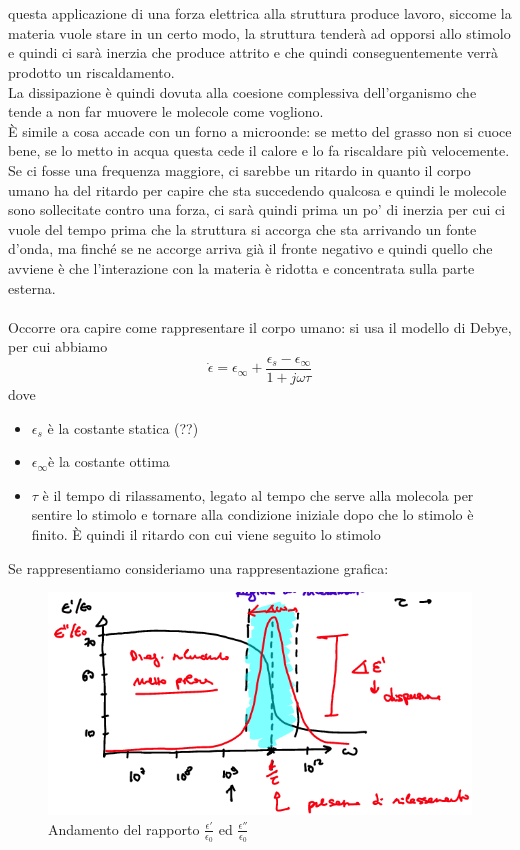 \documentclass[oneside, 12pt]{extbook}
\begin{document}
\\\\questa applicazione di una forza elettrica alla struttura produce lavoro, siccome la materia vuole stare in un certo modo, la struttura tenderà ad opporsi allo stimolo e quindi ci sarà inerzia che produce attrito e che quindi conseguentemente verrà prodotto un riscaldamento.\\La dissipazione è quindi dovuta alla coesione complessiva dell'organismo che tende a non far muovere le molecole come vogliono.\\È simile a cosa accade con un forno a microonde: se metto del grasso non si cuoce bene, se lo metto in acqua questa cede il calore e lo fa riscaldare più velocemente.\\Se ci fosse una frequenza maggiore, ci sarebbe un ritardo in quanto il corpo umano ha del ritardo per capire che sta succedendo qualcosa e quindi le molecole sono sollecitate contro una forza, ci sarà quindi prima un po' di inerzia per cui ci vuole del tempo prima che la struttura si accorga che sta arrivando un fonte d'onda, ma finché se ne accorge arriva già il fronte negativo e quindi quello che avviene è che l'interazione con la materia è ridotta e concentrata sulla parte esterna.\\\\Occorre ora capire come rappresentare il corpo umano: si usa il modello di Debye, per cui abbiamo
\begin{equation}
	\dot{\epsilon} = \epsilon_{\infty} + \dfrac{\epsilon_s - \epsilon_{\infty}}{1 + j\omega \tau} 
\end{equation}
dove
\begin{itemize}
	\item $\epsilon_s$ è la costante statica (??)
	\item $\epsilon_{\infty}$è la costante ottima
	\item $\tau$ è il tempo di rilassamento, legato al tempo che serve alla molecola per sentire lo stimolo e tornare alla condizione iniziale dopo che lo stimolo è finito. È quindi il ritardo con cui viene seguito lo stimolo
\end{itemize}
Se rappresentiamo consideriamo una rappresentazione grafica:
\begin{figure}[!h]
	\includegraphics[scale=0.5]{immagini/eps_in_time.png}
	\caption{Andamento del rapporto $\frac{\epsilon'}{\epsilon_0}$ ed $\frac{\epsilon''}{\epsilon_0}$}
\end{figure}
\end{document}
